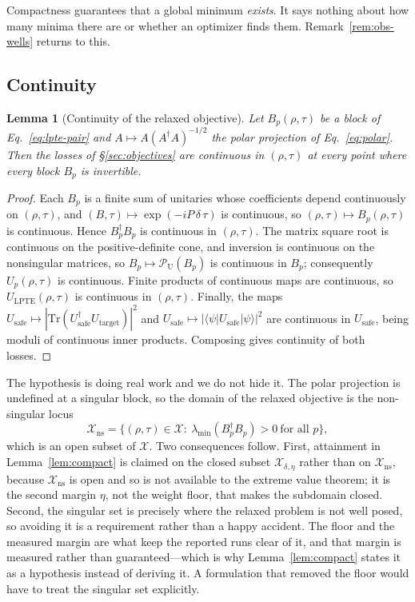 \documentclass[twocolumn,aps,prl,superscriptaddress,showkeys]{revtex4-2}
\theoremstyle{plain}
\newtheorem{lemma}{Lemma}
\theoremstyle{definition}
\newcommand{\Usafe}{U_{\text{safe}}}
\begin{document}
Compactness guarantees that a global minimum \emph{exists}. It says nothing about how many minima there are or whether an optimizer finds them. Remark~\ref{rem:obs-wells} returns to this.

\subsection{Continuity}

\begin{lemma}[Continuity of the relaxed objective]
\label{lem:continuous}
Let $B_p(\rho,\tau)$ be a block of Eq.~\eqref{eq:lpte-pair} and $A\mapsto A(A^\dagger A)^{-1/2}$ the polar projection of Eq.~\eqref{eq:polar}. Then the losses of \S\ref{sec:objectives} are continuous in $(\rho,\tau)$ at every point where every block $B_p$ is invertible.
\end{lemma}
\begin{proof}
Each $B_p$ is a finite sum of unitaries whose coefficients depend continuously on $(\rho,\tau)$, and $(B,\tau)\mapsto\exp(-iP\,\delta\,\tau)$ is continuous, so $(\rho,\tau)\mapsto B_p(\rho,\tau)$ is continuous. Hence $B_p^\dagger B_p$ is continuous in $(\rho,\tau)$. The matrix square root is continuous on the positive-definite cone, and inversion is continuous on the nonsingular matrices, so $B_p\mapsto\mathcal P_{\mathrm U}(B_p)$ is continuous in $B_p$; consequently $U_p(\rho,\tau)$ is continuous. Finite products of continuous maps are continuous, so $U_{\mathrm{LPTE}}(\rho,\tau)$ is continuous in $(\rho,\tau)$. Finally, the maps $\Usafe\mapsto|\mathrm{Tr}(\Usafe^\dagger U_{\mathrm{target}})|^2$ and $\Usafe\mapsto|\langle\psi|\Usafe|\psi\rangle|^2$ are continuous in $\Usafe$, being moduli of continuous inner products. Composing gives continuity of both losses.
\end{proof}

The hypothesis is doing real work and we do not hide it. The polar projection is undefined at a singular block, so the domain of the relaxed objective is the non-singular locus
\[
\mathcal{X}_{\mathrm{ns}}=\{(\rho,\tau)\in\mathcal{X}:\ \lambda_{\min}(B_p^\dagger B_p)>0\ \text{for all } p\},
\]
which is an open subset of $\mathcal{X}$. Two consequences follow. First, attainment in Lemma~\ref{lem:compact} is claimed on the closed subset $\mathcal{X}_{\delta,\eta}$ rather than on $\mathcal{X}_{\mathrm{ns}}$, because $\mathcal{X}_{\mathrm{ns}}$ is open and so is not available to the extreme value theorem; it is the second margin $\eta$, not the weight floor, that makes the subdomain closed. Second, the singular set is precisely where the relaxed problem is not well posed, so avoiding it is a requirement rather than a happy accident. The floor and the measured margin are what keep the reported runs clear of it, and that margin is measured rather than guaranteed---which is why Lemma~\ref{lem:compact} states it as a hypothesis instead of deriving it. A formulation that removed the floor would have to treat the singular set explicitly.
\end{document}
